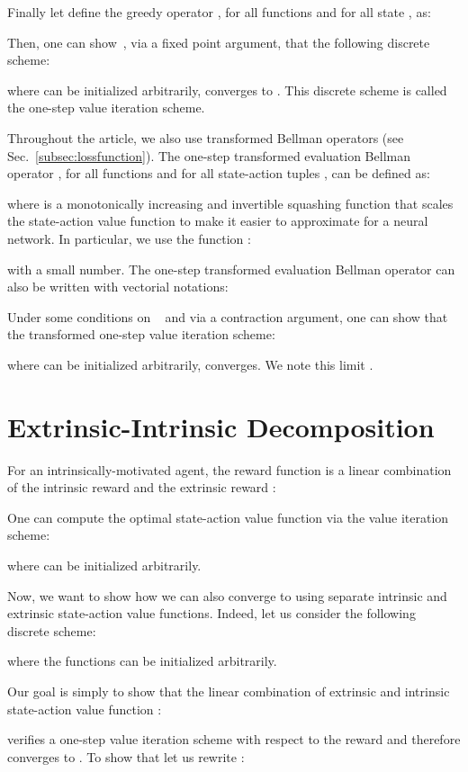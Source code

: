 \documentclass{article}
\begin{document}
Finally let define the greedy operator , for all functions  and for all state , as:

Then, one can show~\citep{puterman1990markov}, via a fixed point argument, that the following discrete scheme:

where  can be initialized arbitrarily, converges to . This discrete scheme is called the one-step value iteration scheme.

Throughout the article, we also use transformed Bellman operators (see Sec.~\ref{subsec:lossfunction}). The one-step transformed evaluation Bellman operator , for all functions  and for all state-action tuples , can be defined as:

where  is a monotonically increasing and invertible  squashing function that scales the state-action value function to make it easier to approximate for a neural network.  
In particular, we use the function :

with  a small number.
The one-step transformed evaluation Bellman operator can also be written with vectorial notations:


Under some conditions on ~\citep{pohlen2018observe} and via a contraction argument, one can show that the transformed one-step value iteration scheme:

where  can be initialized arbitrarily, converges. We note this limit . \section{Extrinsic-Intrinsic Decomposition}
\label{app:decoupling}
For an intrinsically-motivated agent, the reward function  is a linear combination of the intrinsic reward  and the extrinsic reward :

One can compute the optimal state-action value function  via the value iteration scheme:

where  can be initialized arbitrarily.


Now, we want to show how we can also converge to  using separate intrinsic and extrinsic state-action value functions. Indeed, let us consider the following discrete scheme:

where the functions  can be initialized arbitrarily.

Our goal is simply to show that the linear combination of extrinsic and intrinsic state-action value function :

verifies a one-step value iteration scheme with respect to the reward  and therefore converges to . To show that let us rewrite :
\end{document}
